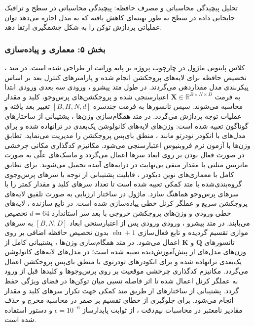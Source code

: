 تحلیل پیچیدگی محاسباتی و مصرف حافظه:
پیچیدگی محاسباتی در سطح  و ترافیک جابجایی داده در سطح  به طور بهینه‌ای کاهش یافته که به مدل اجازه می‌دهد توان عملیاتی پردازش توکن را به شکل چشمگیری ارتقا دهد.

\subsubsection*{بخش ۵: معماری و پیاده‌سازی }
کلاس پایتونی ماژول  در چارچوب پروژه بر پایه وراثت از  طراحی شده است. در متد ، تخصیص حافظه برای لایه‌های پروجکشن انجام شده و پارامترهای کنترل بعد بر اساس پیکربندی مدل مقداردهی می‌گردند.
در طول متد پیشرو ، ورودی سه بعدی ورودی ابتدا به فرمت $\mathbf{X} \in \mathbb{R}^{B \times N \times D}$ اعتبارسنجی شده و پروجکشن‌های پرس‌وجو، کلید و مقدار محاسبه می‌شوند. سپس تانسورها به فرمت چندسره $[B, H, N, d]$ تغییر بعد یافته و عملیات توجه پردازش می‌گردد.
در متد همگام‌سازی وزن‌ها ، پشتیبانی از ساختارهای گوناگون تعبیه شده است: وزن‌های لایه‌های کانولوشن یک‌بعدی  در  ترانهاده شده و برای مدل‌های با انکودر تودرتو مانند ، منطق  بای‌پس پروجکشن را مدیریت می‌نماید. تطابق وزن‌ها با آزمون نرم فروبنیوس اعتبارسنجی می‌شود.
مکانیزم کدگذاری مکانی چرخشی  در صورت فعال بودن بر روی ابعاد سرها اعمال می‌گردد و ماسک‌های علّی به صورت ماتریس مثلثی با مقدار منفی بی‌نهایت در درایه‌های آینده تحمیل می‌شوند.
برای تطابق کامل با معماری‌های نوین دیکودر ، قابلیت پشتیبانی از توجه با سرهای پرس‌وجوی گروه‌بندی‌شده  با متد کمکی  تعبیه شده است تا تعداد سرهای کلید و مقدار کمتر را با سرهای پرس‌وجو هماهنگ سازد.
ماژول  در ساختار ارزیابی به صورت تلفیق لایه‌های پروجکشن سریع و عملگر کرنل خطی پیاده‌سازی شده است. در تابع سازنده ، لایه‌های خطی ورودی و وزن‌های پروجکشن خروجی با بعد سر استاندارد $d=64$ تخصیص می‌یابند.
در متد پیشرو ، ورودی ورودی پس از اعتبارسنجی ابعاد $[B, N, D]$ به سرهای موازی تقسیم گردیده و تابع فعال‌سازی $\operatorname{elu} + 1$ بدون تخصیص حافظه اضافی  بر روی تانسورهای $\mathbf{Q}$ و $\mathbf{K}$ اعمال می‌شود.
در متد همگام‌سازی وزن‌ها ، پشتیبانی کامل از وزن‌های مدل‌های از پیش‌آموزش‌دیده تعبیه شده است؛ در مدل‌های  لایه‌های کانولوشن یک‌بعدی ترانهاده شده و برای انکودرهای تودرتوی  با منطق  بای‌پس پروجکشن اعمال می‌گردد.
مکانیزم کدگذاری چرخشی موقعیت  بر روی پرس‌وجوها و کلیدها قبل از ورود به عملگر کرنل اعمال شده تا اثر فاصله نسبی میان توکن‌ها در فضای ویژگی حفظ گردد.
پشتیبانی از ساختارهای  از طریق متد کمکی  جهت تکرار سرهای کلید و مقدار انجام می‌شود.
برای جلوگیری از خطای تقسیم بر صفر در محاسبه مخرج و حذف مقادیر نامعتبر  در محاسبات نیم‌دقت ، از ثوابت پایدارساز $\epsilon = 10^{-6}$ و دستور  استفاده شده است.

